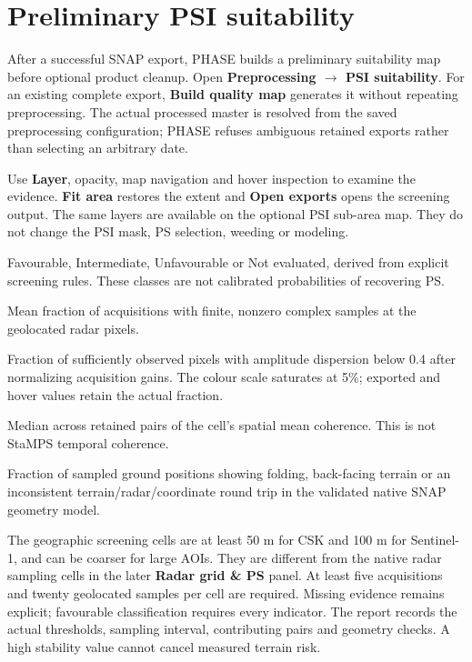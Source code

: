 \section{Preliminary PSI suitability}\label{sec:psi-quality}
After a successful SNAP export, PHASE builds a preliminary suitability map before optional product cleanup. Open \textbf{Preprocessing $\rightarrow$ PSI suitability}. For an existing complete export, \textbf{Build quality map} generates it without repeating preprocessing. The actual processed master is resolved from the saved preprocessing configuration; PHASE refuses ambiguous retained exports rather than selecting an arbitrary date.

Use \textbf{Layer}, opacity, map navigation and hover inspection to examine the evidence. \textbf{Fit area} restores the extent and \textbf{Open exports} opens the screening output. The same layers are available on the optional PSI sub-area map. They do not change the PSI mask, PS selection, weeding or modeling.

\begin{description}[style=nextline]
\item[Preliminary suitability] Favourable, Intermediate, Unfavourable or Not evaluated, derived from explicit screening rules. These classes are not calibrated probabilities of recovering PS.
\item[Stack coverage] Mean fraction of acquisitions with finite, nonzero complex samples at the geolocated radar pixels.
\item[Amplitude stability] Fraction of sufficiently observed pixels with amplitude dispersion below 0.4 after normalizing acquisition gains. The colour scale saturates at 5\%; exported and hover values retain the actual fraction.
\item[Interferogram coherence] Median across retained pairs of the cell's spatial mean coherence. This is not StaMPS temporal coherence.
\item[Terrain mapping risk] Fraction of sampled ground positions showing folding, back-facing terrain or an inconsistent terrain/radar/coordinate round trip in the validated native SNAP geometry model.
\end{description}

The geographic screening cells are at least 50 m for CSK and 100 m for Sentinel-1, and can be coarser for large AOIs. They are different from the native radar sampling cells in the later \textbf{Radar grid \& PS} panel. At least five acquisitions and twenty geolocated samples per cell are required. Missing evidence remains explicit; favourable classification requires every indicator. The report records the actual thresholds, sampling interval, contributing pairs and geometry checks. A high stability value cannot cancel measured terrain risk.


